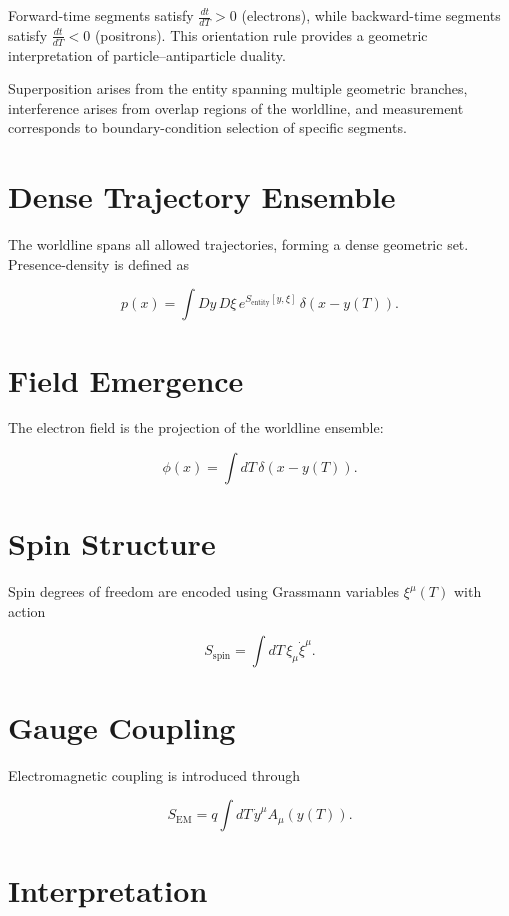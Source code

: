 \documentclass[12pt]{report}
\begin{document}
Forward-time segments satisfy $\frac{dt}{dT} > 0$ (electrons), while
backward-time segments satisfy $\frac{dt}{dT} < 0$ (positrons). This orientation
rule provides a geometric interpretation of particle--antiparticle duality.

Superposition arises from the entity spanning multiple geometric branches,
interference arises from overlap regions of the worldline, and measurement
corresponds to boundary-condition selection of specific segments.

\section{Dense Trajectory Ensemble}

The worldline spans all allowed trajectories, forming a dense geometric set.
Presence-density is defined as


\[
p(x) = \int Dy\,D\xi\, e^{S_{\text{entity}}[y,\xi]}\, \delta(x - y(T)).
\]



\section{Field Emergence}

The electron field is the projection of the worldline ensemble:


\[
\phi(x) = \int dT\, \delta(x - y(T)).
\]



\section{Spin Structure}

Spin degrees of freedom are encoded using Grassmann variables $\xi^\mu(T)$ with
action


\[
S_{\text{spin}} = \int dT\, \xi_\mu \dot{\xi}^\mu.
\]



\section{Gauge Coupling}

Electromagnetic coupling is introduced through


\[
S_{\text{EM}} = q \int dT\, \dot{y}^\mu A_\mu(y(T)).
\]



\section{Interpretation}
\end{document}
